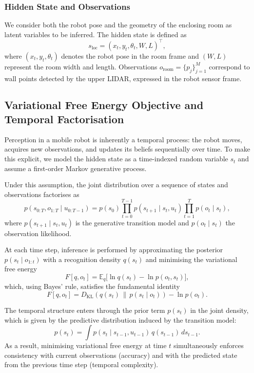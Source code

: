 \documentclass[a4paper, twoside]{article}
\begin{document}
\subsubsection{Hidden State and Observations}
\label{sec:room-state-observations}

We consider both the robot pose and the geometry of the enclosing room as latent
variables to be inferred. The hidden state is defined as
\begin{equation}
s_{\text{loc}} = (x_t, y_t, \theta_t, W, L)^\top ,
\end{equation}
where $(x_t, y_t, \theta_t)$ denotes the robot pose in the room frame and $(W,L)$
represent the room width and length. Observations
$o_{\text{room}} = \{p_j\}_{j=1}^M$ correspond to wall points detected by the upper
LIDAR, expressed in the robot sensor frame.

\subsection{Variational Free Energy Objective and Temporal Factorisation}

Perception in a mobile robot is inherently a temporal process: the robot moves, acquires new observations, and updates its beliefs sequentially over time. To make this explicit, we model the hidden state as a time-indexed random variable $s_t$ and assume a first-order Markov generative process.

Under this assumption, the joint distribution over a sequence of states and observations factorises as
\[
p(s_{0:T}, o_{1:T} \mid u_{0:T-1})
= p(s_0)\prod_{t=0}^{T-1} p(s_{t+1}\mid s_t, u_t)\prod_{t=1}^{T} p(o_t\mid s_t),
\]
where $p(s_{t+1}\mid s_t, u_t)$ is the generative transition model and $p(o_t\mid s_t)$ the observation likelihood.

At each time step, inference is performed by approximating the posterior $p(s_t \mid o_{1:t})$ with a recognition density $q(s_t)$ and minimising the variational free energy
\[
F[q, o_t] = \mathbb{E}_{q}\big[\ln q(s_t) - \ln p(o_t, s_t)\big],
\]
which, using Bayes’ rule, satisfies the fundamental identity
\[
F[q, o_t] = D_{\mathrm{KL}}\!\left(q(s_t)\,\|\,p(s_t \mid o_t)\right) - \ln p(o_t).
\]

The temporal structure enters through the prior term $p(s_t)$ in the joint density, which is given by the predictive distribution induced by the transition model:
\[
p(s_t) = \int p(s_t \mid s_{t-1}, u_{t-1})\,q(s_{t-1})\,ds_{t-1}.
\]
As a result, minimising variational free energy at time $t$ simultaneously enforces consistency with current observations (accuracy) and with the predicted state from the previous time step (temporal complexity).
\end{document}
